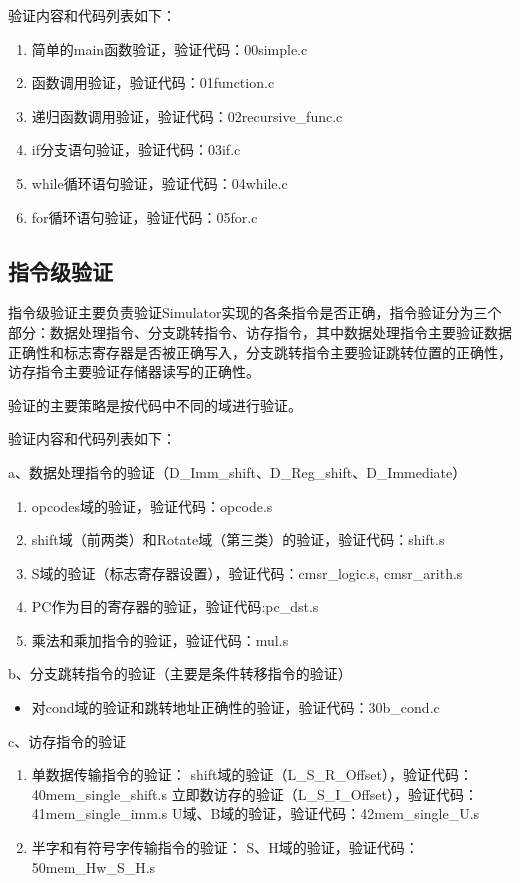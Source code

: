 \documentclass[12pt,a4paper]{article}
\begin{document}
验证内容和代码列表如下：
\begin{enumerate}
	\item 简单的main函数验证，验证代码：00simple.c
    \item 函数调用验证，验证代码：01function.c
    \item 递归函数调用验证，验证代码：02recursive\_func.c
    \item if分支语句验证，验证代码：03if.c
    \item while循环语句验证，验证代码：04while.c
    \item for循环语句验证，验证代码：05for.c
\end{enumerate}

\subsection{指令级验证}
指令级验证主要负责验证Simulator实现的各条指令是否正确，指令验证分为三个部分：数据处理指令、分支跳转指令、访存指令，其中数据处理指令主要验证数据正确性和标志寄存器是否被正确写入，分支跳转指令主要验证跳转位置的正确性，访存指令主要验证存储器读写的正确性。

验证的主要策略是按代码中不同的域进行验证。

验证内容和代码列表如下：

a、数据处理指令的验证（D\_Imm\_shift、D\_Reg\_shift、D\_Immediate）

\begin{enumerate}
    \item opcodes域的验证，验证代码：opcode.s
    \item shift域（前两类）和Rotate域（第三类）的验证，验证代码：shift.s
    \item S域的验证（标志寄存器设置），验证代码：cmsr\_logic.s, cmsr\_arith.s
    \item PC作为目的寄存器的验证，验证代码:pc\_dst.s
    \item 乘法和乘加指令的验证，验证代码：mul.s
\end{enumerate}
    
b、分支跳转指令的验证（主要是条件转移指令的验证）
\begin{itemize}
    \item 对cond域的验证和跳转地址正确性的验证，验证代码：30b\_cond.c
\end{itemize}
    
c、访存指令的验证
\begin{enumerate}
    \item 单数据传输指令的验证：
    \subitem shift域的验证（L\_S\_R\_Offset），验证代码：40mem\_single\_shift.s
    \subitem 立即数访存的验证（L\_S\_I\_Offset），验证代码：41mem\_single\_imm.s
    \subitem U域、B域的验证，验证代码：42mem\_single\_U.s
    \item 半字和有符号字传输指令的验证：
    \subitem S、H域的验证，验证代码：50mem\_Hw\_S\_H.s
\end{enumerate}
\end{document}

